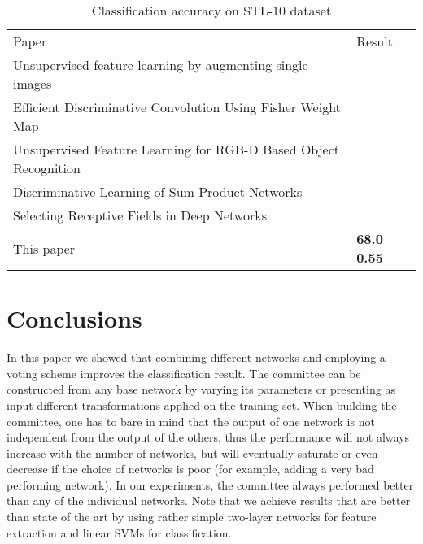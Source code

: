 \documentclass[runningheads]{llncs}
\begin{document}
\setlength{\tabcolsep}{4pt}
\begin{table}
\begin{center}
\caption{Classification accuracy on STL-10 dataset}
\begin{tabular}{l|l}
\hline\noalign{\smallskip}
Paper & Result \\
\noalign{\smallskip}
\hline
\noalign{\smallskip}
Unsupervised feature learning by augmenting single
images \cite{DBLP:journals/corr/DosovitskiySB13}  &  \\
Efficient Discriminative Convolution Using
Fisher Weight Map \cite{EDCUFWM}  &  \\
Unsupervised Feature Learning for RGB-D Based Object Recognition \cite{bo_iser12} &  \\
Discriminative Learning of Sum-Product Networks \cite{NIPS2012_4516} &  \\
Selecting Receptive Fields in Deep Networks \cite{NIPS2011_4293} &  \\
This paper & \bf 68.0  0.55 \\
\hline
\end{tabular}
\end{center}
\end{table}
\setlength{\tabcolsep}{1.4pt}

\vspace{-1cm}

\section{Conclusions}
In this paper we showed that combining different networks and employing a voting scheme improves the classification result.
The committee can be constructed from any base network by varying its parameters or presenting as input different transformations applied on the training set.
When building the committee, one has to bare in mind that the output of one network is not independent from the output of the others, thus the performance will not always increase with the number of networks, but will eventually saturate or even decrease if the choice of networks is poor (for example, adding a very bad performing network). In our experiments, the committee always performed better than any of the individual networks.
Note that we achieve results that are better than state of the art by using rather simple two-layer networks for feature extraction and linear SVMs for classification.



\end{document}
